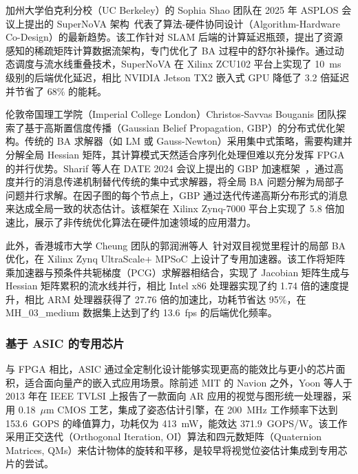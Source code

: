 加州大学伯克利分校（UC Berkeley）的 Sophia Shao 团队在 2025 年 ASPLOS 会议上提出的 SuperNoVA 架构~\cite{zhao2025supernova}代表了算法-硬件协同设计（Algorithm-Hardware Co-Design）的最新趋势。该工作针对 SLAM 后端的计算延迟瓶颈，提出了资源感知的稀疏矩阵计算数据流架构，专门优化了 BA 过程中的舒尔补操作。通过动态调度与流水线重叠技术，SuperNoVA 在 Xilinx ZCU102 平台上实现了 10~ms 级别的后端优化延迟，相比 NVIDIA Jetson TX2 嵌入式 GPU 降低了 3.2 倍延迟并节省了 68\% 的能耗。

伦敦帝国理工学院（Imperial College London）Christos-Savvas Bouganis 团队探索了基于高斯置信度传播（Gaussian Belief Propagation, GBP）的分布式优化架构。传统的 BA 求解器（如 LM 或 Gauss-Newton）采用集中式策略，需要构建并分解全局 Hessian 矩阵，其计算模式天然适合序列化处理但难以充分发挥 FPGA 的并行优势。Sharif 等人在 DATE 2024 会议上提出的 GBP 加速框架~\cite{sharif2024framework}，通过高度并行的消息传递机制替代传统的集中式求解器，将全局 BA 问题分解为局部子问题并行求解。在因子图的每个节点上，GBP 通过迭代传递高斯分布形式的消息来达成全局一致的状态估计。该框架在 Xilinx Zynq-7000 平台上实现了 5.8 倍加速比，展示了非传统优化算法在硬件加速领域的应用潜力。


此外，香港城市大学 Cheung 团队的郭润洲等人~\cite{guo2022fpga}针对双目视觉里程计的局部 BA 优化，在 Xilinx Zynq UltraScale+ MPSoC 上设计了专用加速器。该工作将矩阵乘加速器与预条件共轭梯度（PCG）求解器相结合，实现了 Jacobian 矩阵生成与 Hessian 矩阵累积的流水线并行，相比 Intel x86 处理器实现了约 1.74 倍的速度提升，相比 ARM 处理器获得了 27.76 倍的加速比，功耗节省达 95\%，在 MH\_03\_medium 数据集上达到了约 13.6~fps 的后端优化频率。

\subsubsection{基于 ASIC 的专用芯片}

与 FPGA 相比，ASIC 通过全定制化设计能够实现更高的能效比与更小的芯片面积，适合面向量产的嵌入式应用场景。除前述 MIT 的 Navion\cite{suleiman2019navion} 之外，Yoon 等人\cite{yoon2013graphics}于 2013 年在 IEEE TVLSI 上报告了一款面向 AR 应用的视觉与图形统一处理器，采用 0.18~$\mu$m CMOS 工艺，集成了姿态估计引擎，在 200~MHz 工作频率下达到 153.6~GOPS 的峰值算力，功耗仅为 413~mW，能效达 371.9~GOPS/W。该工作采用正交迭代（Orthogonal Iteration, OI）算法和四元数矩阵（Quaternion Matrices, QMs）来估计物体的旋转和平移，是较早将视觉位姿估计集成到专用芯片的尝试。

